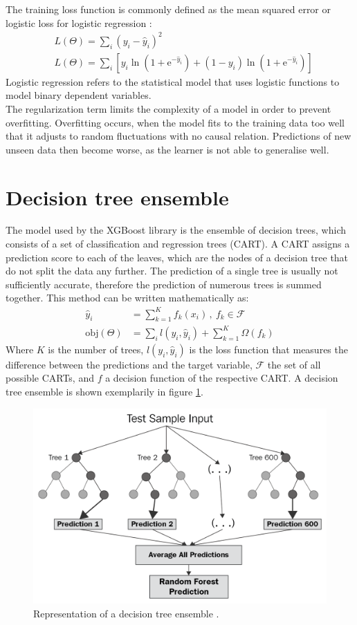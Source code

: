 The training loss function is commonly defined as the mean squared error or logistic loss for logistic regression \cite{logistic}:
\begin{align}
  &L(\Theta) = \sum_i (y_i - \hat{y}_i)^2 \\
  &L(\Theta) = \sum_i [y_i \ln{(1 + \text{e}^{-\hat{y}_i})} + (1 - y_i) \ln{(1 + \text{e}^{-\hat{y}_i})}]
\end{align}
Logistic regression refers to the statistical model that uses logistic functions to model binary dependent variables. \\
The regularization term limits the complexity of a model in order to prevent overfitting. Overfitting occurs, when the model fits to the training data too well that it adjusts
to random fluctuations with no causal relation. Predictions of new unseen data then become worse, as the learner is not able to generalise well.

\section{Decision tree ensemble}
The model used by the XGBoost library is the ensemble of decision trees, which consists of a set of classification and regression trees (CART).
A CART assigns a prediction score to each of the leaves, which are the nodes of a decision tree that do not split the data any further.
The prediction of a single tree is usually not sufficiently accurate,
therefore the prediction of numerous trees is summed together. This method can be written mathematically as:
\begin{align}
  \hat{y}_i &= \sum_{k=1}^K f_k(x_i)\,, \: f_k \in \mathcal{F} \\
  \text{obj}(\Theta) &= \sum_i l(y_i, \hat{y}_i) + \sum_{k=1}^K \Omega(f_k)
\end{align}
Where $K$ is the number of trees, $l(y_i, \hat{y}_i)$ is the loss function that measures the difference between the predictions and the
target variable, $\mathcal{F}$ the set of all possible CARTs, and $f$ a decision function of the respective CART. A decision tree ensemble is shown exemplarily in
figure \ref{fig:random_forest}.

\begin{figure}
  \centering
  \includegraphics[height=0.6\textwidth]{images/random_forest.png}
  \caption{Representation of a decision tree ensemble \cite{random_forest}.}
  \label{fig:random_forest}
\end{figure}

